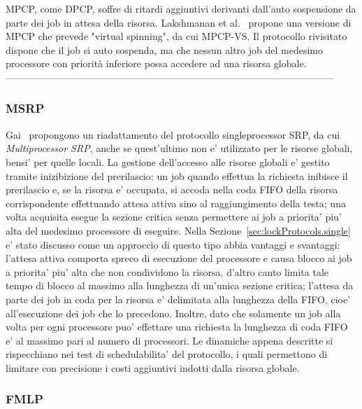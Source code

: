 MPCP, come DPCP, soffre di ritardi aggiuntivi derivanti dall'auto sospensione da parte dei job in attesa della risorsa. Lakshmanan et al.~\cite{5368127} propone una versione di MPCP che prevede "virtual spinning", da cui MPCP-VS. Il protocollo rivisitato dispone che il job si auto sospenda, ma che nessun altro job del medesimo processore con priorità inferiore possa accedere ad una risorsa globale.\\

-----------------------------------------------------------------------------------------------------

\subsubsection{MSRP}
\label{sec:lockProtocols.msrp}

Gai~\cite{Gai:2003:CMM:827266.828537} propongono un riadattamento del protocollo singleprocessor SRP, da cui \textit{Multiprocessor SRP}, anche se quest'ultimo non e' utilizzato per le risorse globali, bensi' per quelle locali. La gestione dell'accesso alle risorse globali e' gestito tramite inizibizione del prerilascio: un job quando effettua la richiesta inibisce il prerilascio e, se la risorsa e' occupata, si accoda nella coda FIFO della risorsa corrispondente effettuando attesa attiva sino al raggiungimento della testa; una volta acquisita esegue la sezione critica senza permettere ai job a priorita' piu' alta del medesimo processore di eseguire. Nella Sezione~\ref{sec:lockProtocols.single} e' stato discusso come un approccio di questo tipo abbia vantaggi e svantaggi: l'attesa attiva comporta spreco di esecuzione del processore e causa blocco ai job a priorita' piu' alta che non condividono la risorsa, d'altro canto limita tale tempo di blocco al massimo alla lunghezza di un'unica sezione critica; l'attesa da parte dei job in coda per la risorsa e' delimitata alla lunghezza della FIFO, cioe' all'esecuzione dei job che lo precedono. Inoltre, dato che solamente un job alla volta per ogni processore puo' effettare una richiesta la lunghezza di coda FIFO e' al massimo pari al numero di processori. Le dinamiche appena descritte si rispecchiano nei test di schedulabilita' del protocollo, i quali permettono di limitare con precisione i costi aggiuntivi indotti dalla risorsa globale.

\subsubsection{FMLP}
\label{sec:lockProtocols.fmlp}

